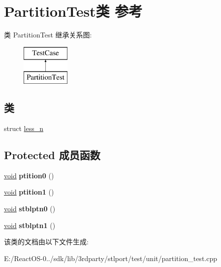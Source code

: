 \hypertarget{class_partition_test}{}\section{Partition\+Test类 参考}
\label{class_partition_test}
类 Partition\+Test 继承关系图\+:\begin{figure}[H]
\begin{center}
\leavevmode
\includegraphics[height=2.000000cm]{class_partition_test}
\end{center}
\end{figure}
\subsection*{类}
\begin{DoxyCompactItemize}
\item 
struct \hyperlink{struct_partition_test_1_1less__n}{less\+\_\+n}
\end{DoxyCompactItemize}
\subsection*{Protected 成员函数}
\begin{DoxyCompactItemize}
\item 
\mbox{\label{class_partition_test_a575ebc6925e8a500b42d05c2a4016b84}} 
\hyperlink{interfacevoid}{void} {\bfseries ptition0} ()
\item 
\mbox{\label{class_partition_test_a6dc8c3e76d0168d446f63492d38518a8}} 
\hyperlink{interfacevoid}{void} {\bfseries ptition1} ()
\item 
\mbox{\label{class_partition_test_a8732b9543ce029bd346a518c50411271}} 
\hyperlink{interfacevoid}{void} {\bfseries stblptn0} ()
\item 
\mbox{\label{class_partition_test_a2c9282d072e2d7eaa2c43e19719c247f}} 
\hyperlink{interfacevoid}{void} {\bfseries stblptn1} ()
\end{DoxyCompactItemize}


该类的文档由以下文件生成\+:\begin{DoxyCompactItemize}
\item 
E\+:/\+React\+O\+S-\/0../sdk/lib/3rdparty/stlport/test/unit/partition\+\_\+test.\+cpp\end{DoxyCompactItemize}
